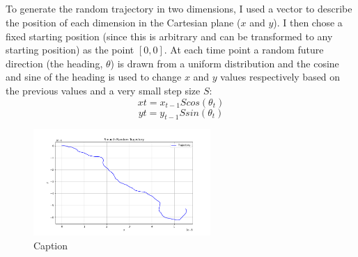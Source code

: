 \documentclass{article}
\begin{document}
\subsection{}
To generate the random trajectory in two dimensions, I used a vector to describe the position of each dimension in the Cartesian plane ($x$ and $y$). I then chose a fixed starting position (since this is arbitrary and can be transformed to any starting position) as the point $[0,0]$.
At each time point a random future direction (the heading, $\theta$) is drawn from a uniform distribution and the cosine and sine of the heading is used to change $x$ and $y$ values respectively based on the previous values and a very small step size $S$: 
\begin{equation*}
    x{t} = x_{t - 1} S cos(\theta_{t})
\end{equation*}
\begin{equation}
    y{t} = y_{t - 1} S sin(\theta_{t})
\end{equation}

\begin{figure}
    \centering
    \includegraphics[width=0.6\textwidth]{konsta_31.png}
    \caption{Caption}
    \label{fig:enter-label}
\end{figure}
\end{document}

